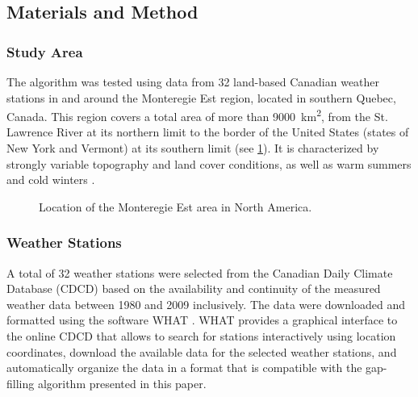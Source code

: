 \documentclass[TechnicalNoteMeteo.tex]{subfiles}
\begin{document}
\subsection{Materials and Method}

\subsubsection{Study Area}

The algorithm was tested using data from 32 land-based Canadian weather stations in and around the Monteregie Est region, located in southern Quebec, Canada. This region covers a total area of more than \SI{9000}{km^2}, from the St. Lawrence River at its northern limit to the border of the United States (states of New York and Vermont) at its southern limit (see \cref{fig:montEst_loc}). It is characterized by strongly variable topography and land cover conditions, as well as warm summers and cold winters \citep{carrier_portrait_2013}. 

\begin{figure}[bh!]
    \caption{Location of the Monteregie Est area in North America.}
    \label{fig:montEst_loc}
\end{figure}

\subsubsection{Weather Stations}

A total of 32 weather stations were selected from the Canadian Daily Climate Database (CDCD) based on the availability and continuity of the measured weather data between 1980 and 2009 inclusively. The data were downloaded and formatted using the software WHAT \citep{gosselin_user_2015}. WHAT provides a graphical interface to the online CDCD that allows to search for stations interactively using location coordinates, download the available data for the selected weather stations, and automatically organize the data in a format that is compatible with the gap-filling algorithm presented in this paper.
\end{document}
